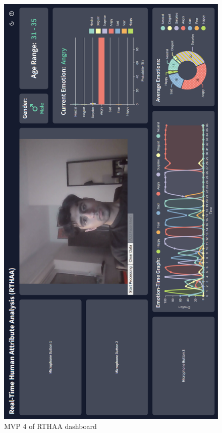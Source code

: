 \documentclass[12pt, a4paper]{article}
\begin{document}
\begin{appendices}

\begin{figure}[H]
    \centering
    \includegraphics[scale=0.58]{images/webappFE7.png}
    \caption{MVP 4 of RTHAA dashboard}
    \label{fig:wa6}
\end{figure}


\end{appendices}
\end{document}
